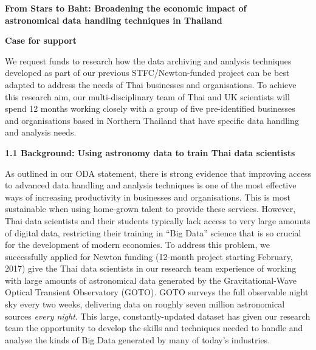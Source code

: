 \documentclass[11pt]{article}
\begin{document}
  \setcounter{figure}{0}
  \noindent
  {\LARGE \bf From Stars to Baht: Broadening the economic impact of \\
  astronomical data handling techniques in Thailand}
  
  \vspace{3mm}
  \noindent
  {\LARGE \bf Case for support}
  \vspace{3mm}
  
  \noindent
  We request funds to research how the data archiving and analysis techniques developed as part of our previous STFC/Newton-funded project can be best adapted to address the needs of Thai businesses and organisations. To achieve this research aim, our multi-disciplinary team of Thai and UK scientists will spend 12 months working closely with a group of five pre-identified businesses and organisations based in Northern Thailand that have specific data handling and analysis needs.
  
  \vspace{3mm}
  \noindent
  {\large \bf 1.1 Background: Using astronomy data to train Thai data scientists}
  
  \noindent
  As outlined in our ODA statement, there is strong evidence that improving access to advanced data handling and analysis techniques is one of the most effective ways of increasing productivity in businesses and organisations. This is most sustainable when using home-grown talent to provide these services. However, Thai data scientists and their students typically lack access to very large amounts of digital data, restricting their training in ``Big Data'' science that is so crucial for the development of modern economies. To address this problem, we successfully applied for Newton funding (12-month project starting February, 2017) give the Thai data scientists in our research team experience of working with large amounts of astronomical data generated by the Gravitational-Wave Optical Transient Observatory (GOTO). GOTO surveys the full observable night sky every two weeks, delivering data on roughly seven million astronomical sources {\it every night}. This large, constantly-updated dataset has given our research team the opportunity to develop the skills and techniques needed to handle and analyse the kinds of Big Data generated by many of today's industries.
  
\end{document}
